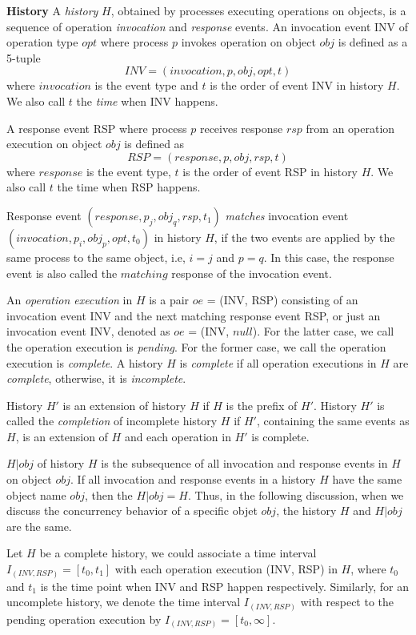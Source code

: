 \textbf{History}
A \emph{history} $H$, obtained by processes executing
operations on objects, is a sequence of operation \emph{invocation}
and \emph{response} events.
An invocation event INV of operation type $opt$ where process $p$ invokes operation on object
$obj$ is defined as a 5-tuple
$$INV = (invocation, p, obj, opt, t)$$
where $invocation$ is the event type and
$t$ is the order of event INV in history $H$. We also call $t$ the \emph{time} when INV happens.

A response event RSP where process $p$ receives response $rsp$ from an operation execution on object $obj$
is defined as
$$RSP = (response, p, obj, rsp, t)$$
where $response$ is the event type, $t$ is the order of event RSP
in history $H$. We also call $t$ the time when RSP happens.

Response event $(response, p_j, obj_q, rsp, t_1)$ \emph{matches} invocation event $(invocation, p_i, obj_p, opt, t_0)$
in history $H$, if the two events are applied by the same process to the same object, i.e, $i = j$ and $p = q$.
In this case, the response event is also called the $matching$ response of the invocation event.

An \emph{operation execution} in $H$ is a pair $oe$ = (INV, RSP) consisting of an invocation event INV
and the next matching response event RSP, or just an invocation event INV, denoted as $oe$ = (INV, $null$).
For the latter case, we call the operation execution is \emph{pending}. For the former case, we call the operation
execution is \emph{complete}. A history $H$ is \emph{complete} if all operation executions in $H$ are \emph{complete},
otherwise, it is \emph{incomplete}.

History $H'$ is an extension of history $H$ if $H$ is the prefix of $H'$.
History $H'$ is called the \emph{completion} of incomplete history $H$ if $H'$, containing the same
events as $H$, is an extension of $H$ and each operation in $H'$ is complete.

$H|obj$ of history $H$ is the subsequence of all
invocation and response events in $H$ on object $obj$. If all invocation and response
events in a history $H$ have the same object name $obj$, then the $H|obj = H$. Thus, in the following discussion,
when we discuss the concurrency behavior of a specific objet $obj$, the history $H$ and $H|obj$ are the same.

Let $H$ be a complete history, we could associate a time interval $I_{(INV, RSP)} = [t_0, t_1]$ with each
operation execution (INV, RSP) in $H$, where $t_0$ and $t_1$ is the time point when INV and RSP happen
respectively. Similarly, for an uncomplete history, we denote the time interval $I_{(INV, RSP)}$ with respect to the pending
operation execution by $I_{(INV, RSP)} = [t_0, \infty]$.

